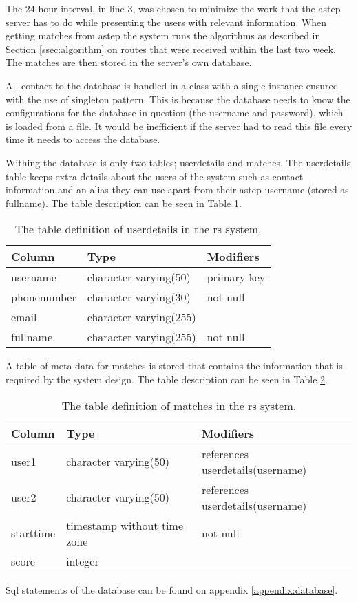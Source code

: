 The 24-hour interval, in line 3, was chosen to minimize the work that the \gls{astep} server has to do while presenting the users with relevant information.
When getting matches from \gls{astep} the system runs the algorithms as described in Section \ref{ssec:algorithm} on routes that were received within the last two week.
The matches are then stored in the server's own database.

All contact to the database is handled in a class with a single instance ensured with the use of singleton pattern. 
This is because the database needs to know the configurations for the database in question (the username and password), which is loaded from a file.
It would be inefficient if the server had to read this file every time it needs to access the database.

Withing the database is only two tables; userdetails and matches.
The userdetails table keeps extra details about the users of the system such as contact information and an alias they can use apart from their \gls{astep} username (stored as fullname).
The table description can be seen in Table \ref{tab:userdetails}.

\begin{table}[h]
	\centering
	\begin{tabular}{l|l|l}
		Column 		& Type                   & Modifiers\\\hline
		username    & character varying(50)  & primary key\\
		phonenumber & character varying(30)  & not null\\
		email       & character varying(255) &\\
		fullname    & character varying(255) & not null\\
	\end{tabular}
	\caption{The table definition of userdetails in the \gls{rs} system.}
	\label{tab:userdetails}
\end{table}

A table of meta data for matches is stored that contains the information that is required by the system design.
The table description can be seen in Table \ref{tab:matches}.

\begin{table}[h]
	\centering
	\begin{tabular}{l|l|l}
			   Column  &            Type             & Modifiers\\\hline
			 user1     & character varying(50)       & references userdetails(username)\\
			 user2     & character varying(50)       & references userdetails(username)\\
			 starttime & timestamp without time zone & not null\\
			 score     & integer                     &
	\end{tabular}
	\caption{The table definition of matches in the \gls{rs} system.}
	\label{tab:matches}
\end{table}

Sql statements of the database can be found on appendix \ref{appendix:database}.